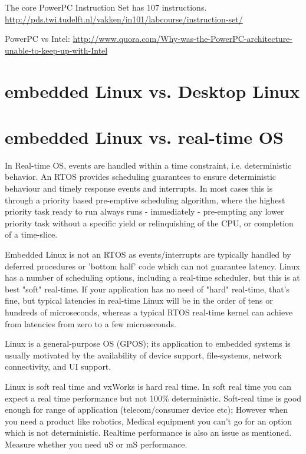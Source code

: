 The core PowerPC Instruction Set has 107 instructions.
\url{http://pds.twi.tudelft.nl/vakken/in101/labcourse/instruction-set/}

PowerPC
vs
Intel:
\url{http://www.quora.com/Why-was-the-PowerPC-architecture-unable-to-keep-up-with-Intel}

\section{embedded Linux vs. Desktop Linux}


\section{embedded Linux vs. real-time OS}

In Real-time OS, events are handled within a time constraint, i.e. deterministic
behavior. An RTOS provides scheduling guarantees to ensure deterministic
behaviour and timely response events and interrupts.  In most cases this is
through a priority based pre-emptive scheduling algorithm, where the highest
priority task ready to run always runs - immediately - pre-empting any lower
priority task without a specific yield or relinquishing of the CPU, or
completion of a time-slice.

Embedded Linux is not an RTOS as events/interrupts are typically handled by
deferred procedures or 'bottom half' code which can not guarantee latency. Linux
has a number of scheduling options, including a real-time scheduler, but this is
at best "soft" real-time. If your application has no need of "hard" real-time,
that's fine, but typical latencies in real-time Linux will be in the order of
tens or hundreds of microseconds, whereas a typical RTOS real-time kernel can
achieve from latencies from zero to a few microseconds.


Linux is a general-purpose OS (GPOS); its application to embedded systems is
usually motivated by the availability of device support, file-systems, network
connectivity, and UI support.

Linux is soft real time and vxWorks is hard real time.
In soft real time you can expect a real time performance but not 100\%
deterministic.
Soft-real time is good enough for range of application (telecom/consumer device
etc); However when you need a product like robotics, Medical equipment you can't
go for an option which is not deterministic.
Realtime performance is also an issue as mentioned. Measure whether
you need uS or mS performance.

